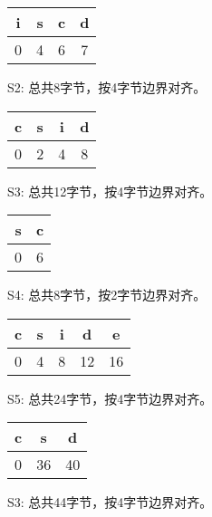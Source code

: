 \documentclass{article}
\begin{document}
\begin{table}[h!]
	\begin{center}
	  \begin{tabular}{c|c|c|c} %
		i & s & c & d \\
		\hline
		0 & 4 & 6 & 7\\
	  \end{tabular}
	\end{center}
\end{table}
S2: 总共8字节，按4字节边界对齐。

\begin{table}[h!]
	\begin{center}
	  \begin{tabular}{c|c|c|c} %
		c & s & i & d \\
		\hline
		0 & 2 & 4 & 8\\
	  \end{tabular}
	\end{center}
\end{table}
S3: 总共12字节，按4字节边界对齐。

\begin{table}[h!]
	\begin{center}
	  \begin{tabular}{c|c} %
		s & c \\
		\hline
		0 & 6 \\
	  \end{tabular}
	\end{center}
\end{table}
S4: 总共8字节，按2字节边界对齐。

\begin{table}[h!]
	\begin{center}
	  \begin{tabular}{c|c|c|c|c} %
		c & s & i & d & e \\
		\hline
		0 & 4 & 8 & 12 & 16\\
	  \end{tabular}
	\end{center}
\end{table}
S5: 总共24字节，按4字节边界对齐。

\begin{table}[h!]
	\begin{center}
	  \begin{tabular}{c|c|c} %
		c & s & d \\
		\hline
		0 & 36 & 40\\
	  \end{tabular}
	\end{center}
\end{table}
S3: 总共44字节，按4字节边界对齐。
\end{document}
